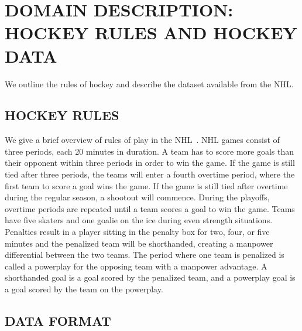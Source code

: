 \documentclass[]{article}
\begin{document}
\section{DOMAIN DESCRIPTION: HOCKEY RULES AND HOCKEY DATA}
\label{sec:background-notation}

We outline the rules of hockey and describe the dataset available from the NHL.

\subsection{HOCKEY RULES}
We give a brief overview of rules of play in the NHL~\citep{NHL2014}. NHL games consist of three periods, each 20 minutes in duration. A team has to score more goals than their opponent within three periods in order to win the game. If the game is still tied after three periods, the teams will enter a fourth overtime period, where the first team to score a goal wins the game. If the game is still tied after overtime during the regular season, a shootout will commence. During the playoffs, overtime periods are repeated until a team scores a goal to win the game. Teams have five skaters and one goalie on the ice during even strength situations.
Penalties result in a player sitting in the penalty box for two, four, or five minutes and the penalized team will be shorthanded, creating a manpower differential between the two teams.
The period where one team is penalized is called a powerplay for the opposing team with a manpower advantage.
A shorthanded goal is a goal scored by the penalized team, and a powerplay goal is a goal scored by the team on the powerplay.

\subsection{DATA FORMAT}
\end{document}
